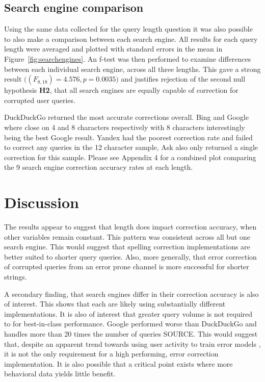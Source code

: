 \documentclass{csfourzero}
\begin{document}
\subsection{Search engine comparison}
Using the same data collected for the query length question it was also possible to also make a comparison between each search engine. All results for each query length were averaged and plotted with standard errors in the mean in Figure~\ref{fig:searchengines}. An f-test was then performed to examine differences between each individual search engine, across all three lengths. This gave a strong result $\big((F_{8,18}) = 4.576, p = 0.0035\big)$ and justifies rejection of the second null hypothesis \textbf{H2}, that all search engines are equally capable of correction for corrupted user queries.

DuckDuckGo returned the most accurate corrections overall. Bing and Google where close on 4 and 8 characters respectively with 8 characters interestingly being the best Google result. Yandex had the poorest correction rate and failed to correct any queries in the 12 character sample, Ask also only returned a single correction for this sample. Please see Appendix 4 for a combined plot comparing the 9 search engine correction accuracy rates at each length.

\section{Discussion}
\label{sec:discuss}

The results appear to suggest that length does impact correction accuracy, when other variables remain constant. This pattern was consistent across all but one search engine. This would suggest that spelling correction implementations are better suited to shorter query queries. Also, more generally, that error correction of corrupted queries from an error prone channel is more successful for shorter strings.

A secondary finding, that search engines differ in their correction accuracy is also of interest. This shows that each are likely using substantially different implementations. It is also of interest that greater query volume is not required to for best-in-class performance. Google performed worse than DuckDuckGo and handles more than 20 times the number of queries SOURCE. This would suggest that, despite an apparent trend towards using user activity to train error models \cite{webuserpoweredspelling, webuser3, webuser2learningerrormodel, webuser4google2009}, it is not the only requirement for a high performing, error correction implementation. It is also possible that a critical point exists where more behavioral data yields little benefit.
\end{document}
